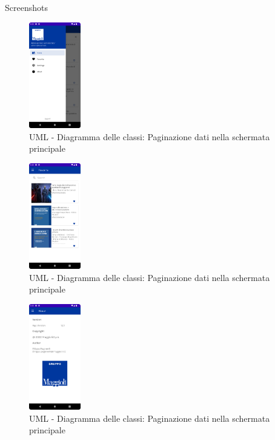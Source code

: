 \documentclass[10pt]{beamer}
\begin{document}
    \begin{frame}{Screenshots}
        \begin{multicols}{3}
            \begin{figure}[H]
                \includegraphics[width=0.2\textwidth]{sidenav.png}
                \caption{UML - Diagramma delle classi: Paginazione dati nella schermata principale}
                \label{sidenav}
            \end{figure}
            
            \begin{figure}[H]
                \includegraphics[width=0.2\textwidth]{preferiti.png}
                \caption{UML - Diagramma delle classi: Paginazione dati nella schermata principale}
                \label{preferiti}
            \end{figure}

            \begin{figure}[H]
                \includegraphics[width=0.2\textwidth]{about.png}
                \caption{UML - Diagramma delle classi: Paginazione dati nella schermata principale}
                \label{about}
            \end{figure}
        \end{multicols}
    \end{frame}
\end{document}
